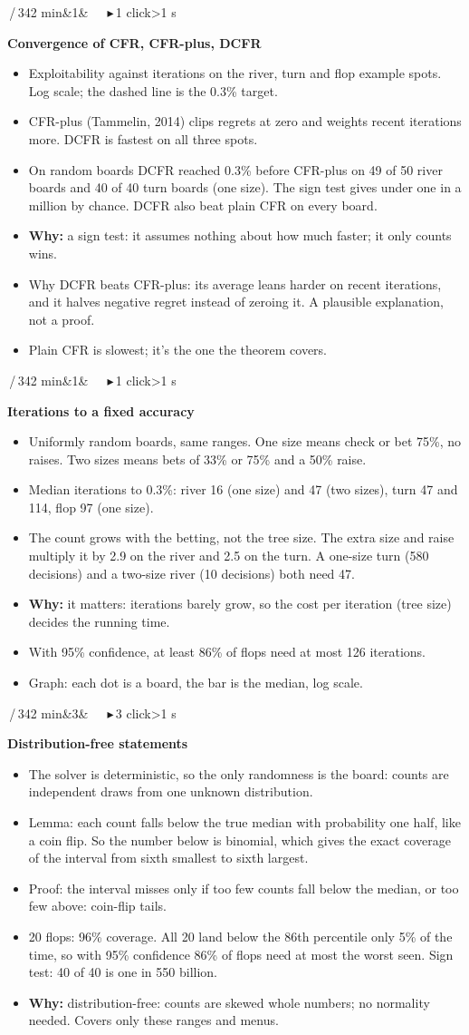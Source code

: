 \documentclass{article}
\newcommand{\slide}[4]{\clearpage
  \noindent\colorbox{bar}{\parbox{\dimexpr\linewidth-2\fboxsep}{\color{white}\fontsize{13}{15}\selectfont
  \textbf{\fontsize{21}{23}\selectfont #1}\,/\,34\hfill #3\ifx&#4&\else\ \ \ \textcolor{ck!40!white}{\ensuremath{\blacktriangleright}}\,#4 click\ifnum#4>1 s\fi\fi\\[2pt]
  \raggedright\textbf{\fontsize{15}{17.5}\selectfont #2}}}\par\vspace{5pt}
  \fontsize{15}{17.8}\selectfont\raggedright}
\newcommand{\pt}{\item[\textbullet]}
\newcommand{\ck}{\item[\textcolor{ck}{\ensuremath{\blacktriangleright}}]}
\newcommand{\why}{\textcolor{why}{\textbf{Why:}} }
\begin{document}
\slide{19}{Convergence of CFR, CFR-plus, DCFR}{2 min}{1}
\begin{itemize}
\pt Exploitability against iterations on the river, turn and flop example spots. Log scale; the dashed line is the 0.3\% target.
\pt CFR-plus (Tammelin, 2014) clips regrets at zero and weights recent iterations more. DCFR is fastest on all three spots.
\ck On random boards DCFR reached 0.3\% before CFR-plus on 49 of 50 river boards and 40 of 40 turn boards (one size). The sign test gives under one in a million by chance. DCFR also beat plain CFR on every board.
\pt \why a sign test: it assumes nothing about how much faster; it only counts wins.
\pt Why DCFR beats CFR-plus: its average leans harder on recent iterations, and it halves negative regret instead of zeroing it. A plausible explanation, not a proof.
\pt Plain CFR is slowest; it's the one the theorem covers.
\end{itemize}

\slide{20}{Iterations to a fixed accuracy}{2 min}{1}
\begin{itemize}
\pt Uniformly random boards, same ranges. One size means check or bet 75\%, no raises. Two sizes means bets of 33\% or 75\% and a 50\% raise.
\pt Median iterations to 0.3\%: river 16 (one size) and 47 (two sizes), turn 47 and 114, flop 97 (one size).
\ck The count grows with the betting, not the tree size. The extra size and raise multiply it by 2.9 on the river and 2.5 on the turn. A one-size turn (580 decisions) and a two-size river (10 decisions) both need 47.
\pt \why it matters: iterations barely grow, so the cost per iteration (tree size) decides the running time.
\pt With 95\% confidence, at least 86\% of flops need at most 126 iterations.
\pt Graph: each dot is a board, the bar is the median, log scale.
\end{itemize}

\slide{21}{Distribution-free statements}{2 min}{3}
\begin{itemize}
\pt The solver is deterministic, so the only randomness is the board: counts are independent draws from one unknown distribution.
\ck Lemma: each count falls below the true median with probability one half, like a coin flip. So the number below is binomial, which gives the exact coverage of the interval from sixth smallest to sixth largest.
\ck Proof: the interval misses only if too few counts fall below the median, or too few above: coin-flip tails.
\ck 20 flops: 96\% coverage. All 20 land below the 86th percentile only 5\% of the time, so with 95\% confidence 86\% of flops need at most the worst seen. Sign test: 40 of 40 is one in 550 billion.
\pt \why distribution-free: counts are skewed whole numbers; no normality needed. Covers only these ranges and menus.
\end{itemize}
\end{document}
